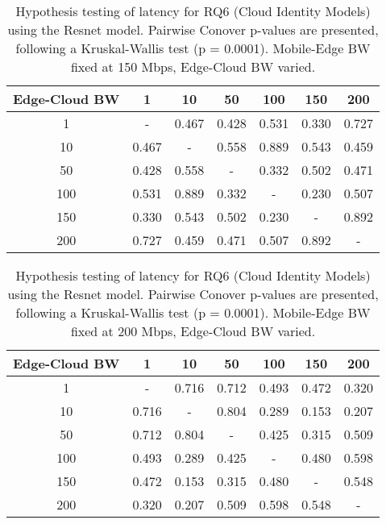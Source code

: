 \begin{table}[H]
\caption{Hypothesis testing of latency for RQ6 (Cloud Identity Models) using the Resnet model. Pairwise Conover p-values are presented, following a Kruskal-Wallis test (p = 0.0001). Mobile-Edge BW fixed at 150 Mbps, Edge-Cloud BW varied.}
\centering
\begin{tabular}{c|cccccc}
Edge-Cloud BW & 1 & 10 & 50 & 100 & 150 & 200 \\
\hline
1 & - & 0.467 & 0.428 & 0.531 & 0.330 & 0.727 \\
10 & 0.467 & - & 0.558 & 0.889 & 0.543 & 0.459 \\
50 & 0.428 & 0.558 & - & 0.332 & 0.502 & 0.471 \\
100 & 0.531 & 0.889 & 0.332 & - & 0.230 & 0.507 \\
150 & 0.330 & 0.543 & 0.502 & 0.230 & - & 0.892 \\
200 & 0.727 & 0.459 & 0.471 & 0.507 & 0.892 & - \\
\end{tabular}
\end{table}

\begin{table}[H]
\caption{Hypothesis testing of latency for RQ6 (Cloud Identity Models) using the Resnet model. Pairwise Conover p-values are presented, following a Kruskal-Wallis test (p = 0.0001). Mobile-Edge BW fixed at 200 Mbps, Edge-Cloud BW varied.}
\centering
\begin{tabular}{c|cccccc}
Edge-Cloud BW & 1 & 10 & 50 & 100 & 150 & 200 \\
\hline
1 & - & 0.716 & 0.712 & 0.493 & 0.472 & 0.320 \\
10 & 0.716 & - & 0.804 & 0.289 & 0.153 & 0.207 \\
50 & 0.712 & 0.804 & - & 0.425 & 0.315 & 0.509 \\
100 & 0.493 & 0.289 & 0.425 & - & 0.480 & 0.598 \\
150 & 0.472 & 0.153 & 0.315 & 0.480 & - & 0.548 \\
200 & 0.320 & 0.207 & 0.509 & 0.598 & 0.548 & - \\
\end{tabular}
\end{table}

